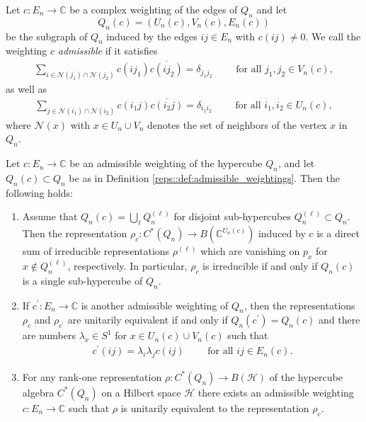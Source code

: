 \documentclass[10pt,a4paper]{amsart}
\newcommand{\C}{\mathbb{C}}
\begin{document}
\begin{definition}
    \label{reps::def:admissible_weightings}
    Let $c: E_n \to \C$ be a complex weighting of the edges of $Q_n$ and let 
    $$
    Q_n(c) = (U_n(c), V_n(c), E_n(c))
    $$
    be the subgraph of $Q_n$ induced by the edges $ij \in E_n$ with $c(ij) \neq 0$.
    We call the weighting $c$ \emph{admissible} if it satisfies
    \begin{align}
        \label{wei::eq:admissible_weighting_condition1}
        \sum_{i \in \mathcal{N}(j_1) \cap \mathcal{N}(j_2)} c(ij_1) \overline{c(ij_2)} = \delta_{j_1j_2} \qquad \text{ for all } j_1, j_2 \in V_n(c),
    \end{align}
    as well as
    \begin{align}
        \label{wei::eq:admissible_weighting_condition2}
        \sum_{j \in \mathcal{N}(i_1) \cap \mathcal{N}(i_2)} c(i_1j) \overline{c(i_2j)} = \delta_{i_1i_2} \qquad \text{ for all } i_1, i_2 \in U_n(c),
    \end{align}
    where $\mathcal{N}(x)$ with $x \in U_n \cup V_n$ denotes the set of neighbors of the vertex $x$ in $Q_n$.
\end{definition}

\begin{lemma}
    \label{hyp::lemma:properties_of_admissible_weightings}
    Let $c: E_n \to \C$ be an admissible weighting of the hypercube $Q_n$, and let $Q_n(c) \subset Q_n$ be as in Definition \ref{reps::def:admissible_weightings}. Then the following holds:
    \begin{enumerate}
        \item Assume that $Q_n(c) = \bigcup_\ell Q_n^{(\ell)}$ for disjoint sub-hypercubes $Q_n^{(\ell)} \subset Q_n$. Then the representation $\rho_c: C^\ast(Q_n) \to B(\C^{U_n(c)})$ induced by $c$ is a direct sum of irreducible representations $\rho^{(\ell)}$ which are vanishing on $p_x$ for $x \not \in Q_n^{(\ell)}$, respectively. In particular, $\rho_c$ is irreducible if and only if $Q_n(c)$ is a single sub-hypercube of $Q_n$.
        \item If $c^\prime: E_n \to \C$ is another admissible weighting of $Q_n$, then the representations $\rho_c$ and $\rho_{c^\prime}$ are unitarily equivalent if and only if $Q_n(c^\prime) = Q_n(c)$ and there are numbers $\lambda_x \in S^1$ for $x \in U_n(c) \cup V_n(c)$ such that
        \begin{align*}
            c^\prime(ij) = \lambda_i \lambda_j c(ij) \qquad \text{ for all } ij \in E_n(c).
        \end{align*}
        \item For any rank-one representation $\rho: C^\ast(Q_n) \to B(\mathcal{H})$ of the hypercube algebra $C^\ast(Q_n)$ on a Hilbert space $\mathcal{H}$ there exists an admissible weighting $c: E_n \to \C$ such that $\rho$ is unitarily equivalent to the representation $\rho_c$.
    \end{enumerate}
\end{lemma}
\end{document}
